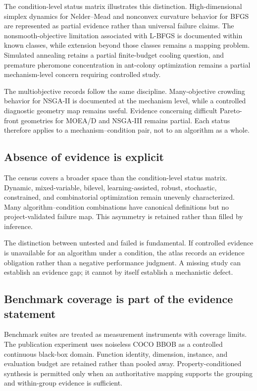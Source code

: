 The condition-level status matrix illustrates this distinction. High-dimensional simplex dynamics for Nelder--Mead and nonconvex curvature behavior for BFGS are represented as partial evidence rather than universal failure claims. The nonsmooth-objective limitation associated with L-BFGS is documented within known classes, while extension beyond those classes remains a mapping problem. Simulated annealing retains a partial finite-budget cooling question, and premature pheromone concentration in ant-colony optimization remains a partial mechanism-level concern requiring controlled study.

The multiobjective records follow the same discipline. Many-objective crowding behavior for NSGA-II is documented at the mechanism level, while a controlled diagnostic geometry map remains useful. Evidence concerning difficult Pareto-front geometries for MOEA/D and NSGA-III remains partial. Each status therefore applies to a mechanism--condition pair, not to an algorithm as a whole.

\subsection{Absence of evidence is explicit}

The census covers a broader space than the condition-level status matrix. Dynamic, mixed-variable, bilevel, learning-assisted, robust, stochastic, constrained, and combinatorial optimization remain unevenly characterized. Many algorithm--condition combinations have canonical definitions but no project-validated failure map. This asymmetry is retained rather than filled by inference.

The distinction between untested and failed is fundamental. If controlled evidence is unavailable for an algorithm under a condition, the atlas records an evidence obligation rather than a negative performance judgment. A missing study can establish an evidence gap; it cannot by itself establish a mechanistic defect.

\subsection{Benchmark coverage is part of the evidence statement}

Benchmark suites are treated as measurement instruments with coverage limits. The publication experiment uses noiseless COCO BBOB as a controlled continuous black-box domain. Function identity, dimension, instance, and evaluation budget are retained rather than pooled away. Property-conditioned synthesis is permitted only when an authoritative mapping supports the grouping and within-group evidence is sufficient.

